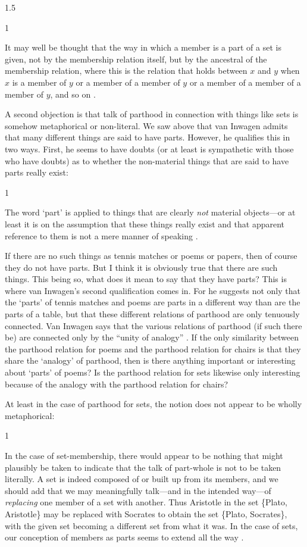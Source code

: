 \documentclass[11pt]{article}
\newenvironment{squote}{%
\begin{spacing}{1}
\begin{list}{}{%
\setlength{\labelwidth}{0pt}%
\rightmargin\leftmargin%
}
\item\relax
}{%
\end{list}%
\end{spacing}
}
\begin{document}
\begin{spacing}{1.5}
\begin{squote}
It may well be thought that the way in which a member is a part of a
set is given, not by the membership relation itself, but by the
ancestral of the membership relation, where this is the relation that
holds between $x$ and $y$ when $x$ is a member of $y$ or a member of a
member of $y$ or a member of a member of a member of $y$, and so on
\citep[563]{fine2010}.
\end{squote}

A second objection is that talk of parthood in connection with things
like sets is somehow metaphorical or non-literal.  We saw above that
van Inwagen admits that many different things are said to have parts.
However, he qualifies this in two ways.  First, he seems to have
doubts (or at least is sympathetic with those who have doubts) as to
whether the non-material things that are said to have parts really
exist:

\begin{squote}
The word `part' is applied to things that are clearly \emph{not}
material objects---or at least it is on the assumption that these
things really exist and that apparent reference to them is not a mere
manner of speaking \citep[19]{inwagen1995}.
\end{squote}

If there are no such things as tennis matches or poems or papers, then
of course they do not have parts.  But I think it is obviously true
that there are such things.  This being so, what does it mean to say
that they have parts?  This is where van Inwagen's second
qualification comes in.  For he suggests not only that the `parts' of
tennis matches and poems are parts in a different way than are the
parts of a table, but that these different relations of parthood are
only tenuously connected.  Van Inwagen says that the various relations
of parthood (if such there be) are connected only by the ``unity of
analogy'' \citeyearpar[19]{inwagen1995}.  If the only similarity
between the parthood relation for poems and the parthood relation for
chairs is that they share the `analogy' of parthood, then is there
anything important or interesting about `parts' of poems?  Is the
parthood relation for sets likewise only interesting because of the
analogy with the parthood relation for chairs?

At least in the case of parthood for sets, the notion does not appear
to be wholly metaphorical:

\begin{squote}
In the case of set-membership, there would appear to be nothing that
might plausibly be taken to indicate that the talk of part-whole is
not to be taken literally. A set is indeed composed of or built up
from its members, and we should add that we may meaningfully
talk---and in the intended way---of \emph{replacing} one member of a
set with another.  Thus Aristotle in the set \{Plato, Aristotle\} may
be replaced with Socrates to obtain the set \{Plato, Socrates\}, with
the given set becoming a different set from what it was. In the case
of sets, our conception of members as parts seems to extend all the
way \citep[564]{fine2010}.
\end{squote}


\end{spacing}
\end{document}
